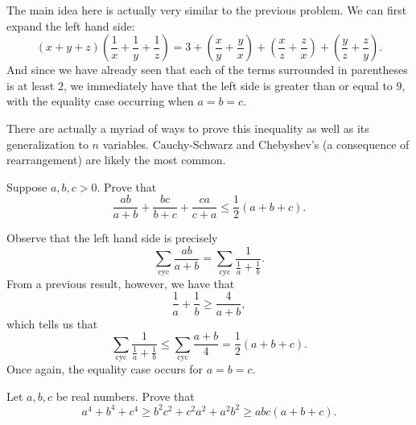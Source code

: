 \documentclass[a4paper, 12pt]{article}
\begin{document}
\begin{solution}
    The main idea here is actually very similar to the previous problem. We can first expand the left hand side:
    \[
        (x + y + z) \left( \frac{1}{x} + \frac{1}{y} + \frac{1}{z} \right) = 3 + \left( \frac{x}{y} + \frac{y}{x} \right) + \left( \frac{x}{z} + \frac{z}{x} \right) + \left( \frac{y}{z} + \frac{z}{y} \right)
    .\]
    And since we have already seen that each of the terms surrounded in parentheses is at least \( 2 \), we immediately have that the left side is greater than or equal to \( 9 \), with the equality case occurring when \( a = b = c \).
\end{solution}

\begin{remark}
    There are actually a myriad of ways to prove this inequality as well as its generalization to \( n \) variables. Cauchy-Schwarz and Chebyshev's (a consequence of rearrangement) are likely the most common.
\end{remark}

\begin{sidebox}
\begin{problem}
    Suppose \( a, b, c > 0 \). Prove that
    \[
        \frac{ab}{a + b} + \frac{bc}{b + c} + \frac{ca}{c + a} \le \frac{1}{2} (a + b + c)
    .\]
\end{problem}
\end{sidebox}

\begin{solution}
    Observe that the left hand side is precisely
    \[
        \sum_{\textrm{cyc}} \frac{ab}{a + b} = \sum_{\textrm{cyc}} \frac{1}{\frac{1}{a} + \frac{1}{b}}
    .\]
    From a previous result, however, we have that
    \[
        \frac{1}{a} + \frac{1}{b} \ge \frac{4}{a + b}
    ,\]
    which tells us that
    \[
        \sum_{\textrm{cyc}} \frac{1}{\frac{1}{a} + \frac{1}{b}} \le \sum_{\textrm{cyc}} \frac{a + b}{4} = \frac{1}{2} (a + b + c)
    .\]
    Once again, the equality case occurs for \( a = b = c \).
\end{solution}

\begin{sidebox}
    \begin{problem}
        Let \( a, b, c \) be real numbers. Prove that
        \[
            a^4 + b^4 + c^4 \ge b^2 c^2 + c^2 a^2 + a^2 b^2 \ge abc(a + b + c)
        .\]
    \end{problem}
\end{sidebox}
\end{document}
